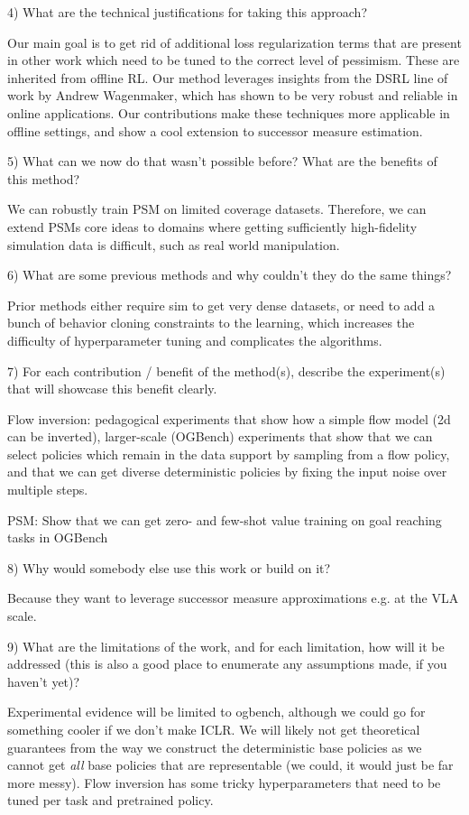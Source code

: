 \documentclass{article} %
\begin{document}
4) What are the technical justifications for taking this approach?

Our main goal is to get rid of additional loss regularization terms that are present in other work which need to be tuned to the correct level of pessimism. These are inherited from offline RL.
Our method leverages insights from the DSRL line of work by Andrew Wagenmaker, which has shown to be very robust and reliable in online applications.
Our contributions make these techniques more applicable in offline settings, and show a cool extension to successor measure estimation.

5) What can we now do that wasn’t possible before? What are the benefits of this method?

We can robustly train PSM on limited coverage datasets. Therefore, we can extend PSMs core ideas to domains where getting sufficiently high-fidelity simulation data is difficult, such as real world manipulation.

6) What are some previous methods and why couldn’t they do the same things?

Prior methods either require sim to get very dense datasets, or need to add a bunch of behavior cloning constraints to the learning, which increases the difficulty of hyperparameter tuning and complicates the algorithms.

7) For each contribution / benefit of the method(s), describe the experiment(s) that will showcase this benefit clearly.

Flow inversion: pedagogical experiments that show how a simple flow model (2d can be inverted), larger-scale (OGBench) experiments that show that we can select policies which remain in the data support by sampling from a flow policy, and that we can get diverse deterministic policies by fixing the input noise over multiple steps.

PSM: Show that we can get zero- and few-shot value training on goal reaching tasks in OGBench

8) Why would somebody else use this work or build on it?

Because they want to leverage successor measure approximations e.g. at the VLA scale.

9) What are the limitations of the work, and for each limitation, how will it be addressed (this is also a good place to enumerate any assumptions made, if you haven’t yet)?

Experimental evidence will be limited to ogbench, although we could go for something cooler if we don't make ICLR.
We will likely not get theoretical guarantees from the way we construct the deterministic base policies as we cannot get \emph{all} base policies that are representable (we could, it would just be far more messy).
Flow inversion has some tricky hyperparameters that need to be tuned per task and pretrained policy.
\end{document}
